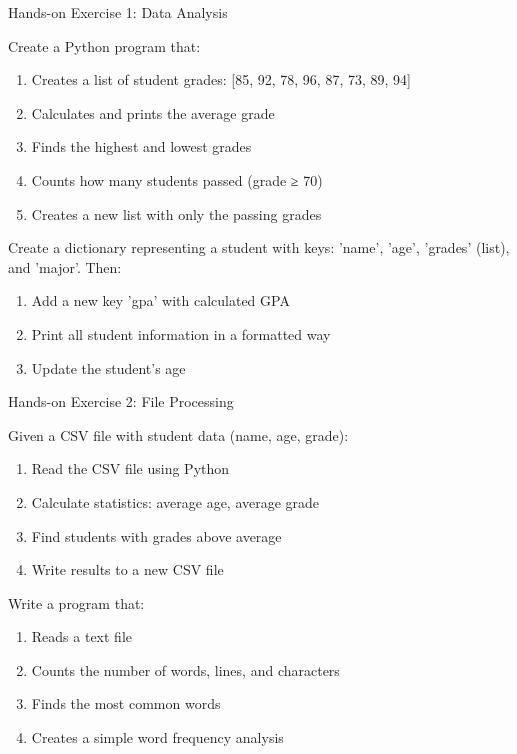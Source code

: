 \begin{frame}{Hands-on Exercise 1: Data Analysis}
    \begin{exercise}
        Create a Python program that:
        \begin{enumerate}
            \item Creates a list of student grades: [85, 92, 78, 96, 87, 73, 89, 94]
            \item Calculates and prints the average grade
            \item Finds the highest and lowest grades
            \item Counts how many students passed (grade ≥ 70)
            \item Creates a new list with only the passing grades
        \end{enumerate}
    \end{exercise}
    
    \begin{exercise}
        Create a dictionary representing a student with keys: 'name', 'age', 'grades' (list), and 'major'. Then:
        \begin{enumerate}
            \item Add a new key 'gpa' with calculated GPA
            \item Print all student information in a formatted way
            \item Update the student's age
        \end{enumerate}
    \end{exercise}
\end{frame}

\begin{frame}{Hands-on Exercise 2: File Processing}
    \begin{exercise}
        Given a CSV file with student data (name, age, grade):
        \begin{enumerate}
            \item Read the CSV file using Python
            \item Calculate statistics: average age, average grade
            \item Find students with grades above average
            \item Write results to a new CSV file
        \end{enumerate}
    \end{exercise}
    
    \begin{exercise}
        Write a program that:
        \begin{enumerate}
            \item Reads a text file
            \item Counts the number of words, lines, and characters
            \item Finds the most common words
            \item Creates a simple word frequency analysis
        \end{enumerate}
    \end{exercise}
\end{frame}

